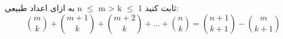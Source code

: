 \p
به ازای اعداد طبیعی
n $\leq$ m > k $\leq$ 1
ثابت کنید:
\[
\binom{m}{k} + \binom{m + 1}{k} + \binom{m + 2}{k} +\ldots +
\binom{n}{k} = \binom{n + 1}{k + 1} - \binom{m}{k + 1}
\]